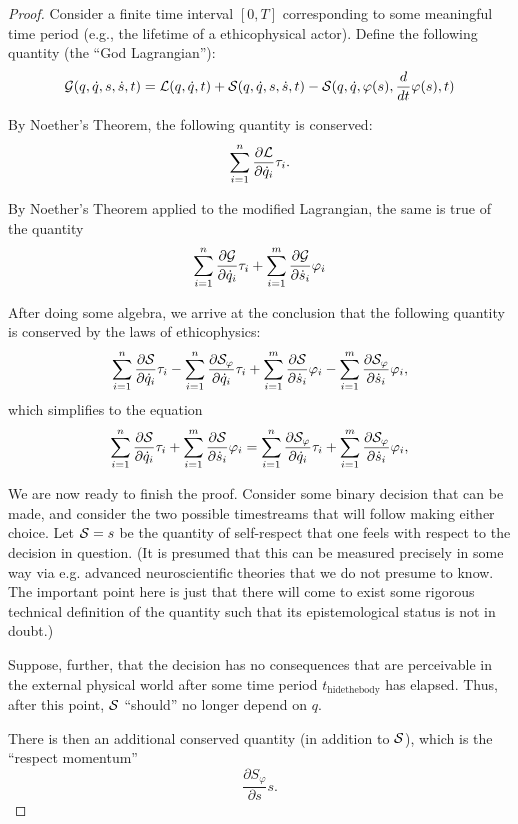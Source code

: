 \documentclass{article}
\begin{document}
\begin{proof}
  Consider a finite time interval $[0, T]$ corresponding to some
  meaningful time period (e.g., the lifetime of a ethicophysical
  actor). Define the following quantity (the ``God Lagrangian''):
  $${\mathcal G}(q, \dot{q}, s, \dot{s}, t) = {\mathcal L}(q, \dot{q}, t) +
  {\mathcal S}(q, \dot{q}, s, \dot{s}, t) - {\mathcal S}(q, \dot{q}, \varphi(s), \frac{d}{dt}\varphi(s), t)$$

  By Noether's Theorem, the following quantity is conserved:
  $$\sum_{i=1}^n \frac{\partial {\mathcal L}}{\partial \dot{q}_i} \tau_i.$$

  By Noether's Theorem applied to the modified Lagrangian, the same is
  true of the quantity
  $$\sum_{i=1}^n \frac{\partial {\mathcal G}}{\partial \dot{q}_i} \tau_i +
  \sum_{i=1}^m \frac{\partial {\mathcal G}}{\partial \dot{s}_i} \varphi_i$$

  After doing some algebra, we arrive at the conclusion that the
  following quantity is conserved by the laws of ethicophysics:
  $$\sum_{i=1}^n \frac{\partial {\mathcal S}}{\partial \dot{q}_i} \tau_i -
  \sum_{i=1}^n \frac{\partial {\mathcal S}_\varphi}{\partial \dot{q}_i} \tau_i +
  \sum_{i=1}^m \frac{\partial {\mathcal S}}{\partial \dot{s}_i} \varphi_i -
  \sum_{i=1}^m \frac{\partial {\mathcal S}_\varphi}{\partial \dot{s}_i} \varphi_i,
  $$
  which simplifies to the equation
  $$\sum_{i=1}^n \frac{\partial {\mathcal S}}{\partial \dot{q}_i} \tau_i +
  \sum_{i=1}^m \frac{\partial {\mathcal S}}{\partial \dot{s}_i} \varphi_i =
  \sum_{i=1}^n \frac{\partial {\mathcal S}_\varphi}{\partial \dot{q}_i} \tau_i +
  \sum_{i=1}^m \frac{\partial {\mathcal S}_\varphi}{\partial \dot{s}_i} \varphi_i,
  $$

  We are now ready to finish the proof. Consider some binary decision
  that can be made, and consider the two possible timestreams that
  will follow making either choice. Let ${\mathcal S} = s$ be the quantity of
  self-respect that one feels with respect to the decision in
  question. (It is presumed that this can be measured precisely in
  some way via e.g. advanced neuroscientific theories that we do not
  presume to know. The important point here is just that there will
  come to exist some rigorous technical definition of the quantity
  such that its epistemological status is not in doubt.)

  Suppose, further, that the decision has no consequences that are
  perceivable in the external physical world after some time period
  $t_{\mathrm{hide the body}}$ has elapsed. Thus, after this point,
  ${\mathcal S}$ ``should'' no longer depend on $q$.

  There is then an additional conserved quantity (in addition to
  ${\mathcal S}$), which is the ``respect momentum''
  $$\frac{\partial S_\varphi}{\partial s} s.$$



\end{proof}
\end{document}

